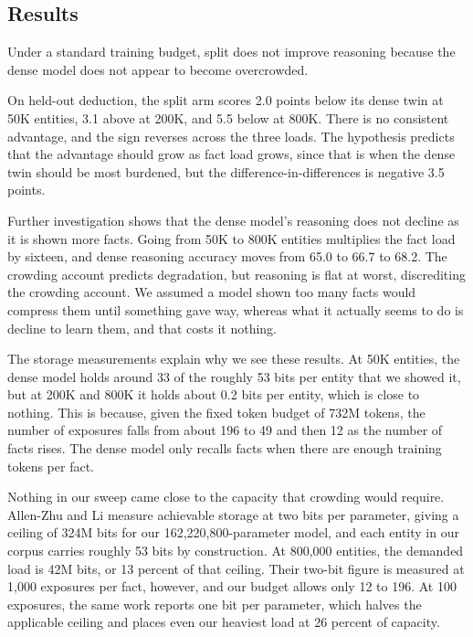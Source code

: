 \documentclass{article}
\begin{document}
\subsection{Results}
\label{sec:exposure-results}

Under a standard training budget, split does not improve reasoning because the dense model does not appear to become overcrowded.

On held-out deduction, the split arm scores 2.0 points below its dense twin at 50K entities, 3.1 above at 200K, and 5.5 below at 800K. There is no consistent advantage, and the sign reverses across the three loads. The hypothesis predicts that the advantage should grow as fact load grows, since that is when the dense twin should be most burdened, but the difference-in-differences is negative 3.5 points.

Further investigation shows that the dense model's reasoning does not decline as it is shown more facts. Going from 50K to 800K entities multiplies the fact load by sixteen, and dense reasoning accuracy moves from 65.0 to 66.7 to 68.2. The crowding account predicts degradation, but reasoning is flat at worst, discrediting the crowding account. We assumed a model shown too many facts would compress them until something gave way, whereas what it actually seems to do is decline to learn them, and that costs it nothing.

The storage measurements explain why we see these results. At 50K entities, the dense model holds around 33 of the roughly 53 bits per entity that we showed it, but at 200K and 800K it holds about 0.2 bits per entity, which is close to nothing. This is because, given the fixed token budget of 732M tokens, the number of exposures falls from about 196 to 49 and then 12 as the number of facts rises. The dense model only recalls facts when there are enough training tokens per fact.

Nothing in our sweep came close to the capacity that crowding would require. Allen-Zhu and Li \citep{allenzhu2024capacity} measure achievable storage at two bits per parameter, giving a ceiling of 324M bits for our 162,220,800-parameter model, and each entity in our corpus carries roughly 53 bits by construction. At 800,000 entities, the demanded load is 42M bits, or 13 percent of that ceiling. Their two-bit figure is measured at 1,000 exposures per fact, however, and our budget allows only 12 to 196. At 100 exposures, the same work reports one bit per parameter, which halves the applicable ceiling and places even our heaviest load at 26 percent of capacity.
\end{document}
